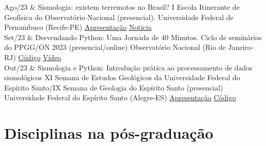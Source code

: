 \documentclass[10pt,a4paper,oneside]{book}
\begin{document}
\begin{subsummarybox}[frametitle=\faEdit{}\quad Seminários e workshops ministrados]
	\begin{paperlist}
		Ago/23  & Sismologia: existem terremotos no Brasil?
		\newline
		\faInfoCircle I Escola Itinerante de Geofísica do Observatório Nacional (presencial).
		\newline
		\faBuilding Universidade Federal de Pernambuco  (Recife-PE)
		\newline
		\faArchive{} \href{https://doi.org/10.6084/m9.figshare.25387180.v1}{Apresentação}
		\faBullhorn{} \href{https://www.ufpe.br/df/todos-os-informes/-/asset_publisher/znKKONCGSp59/content/a-primeira-escola-itinerante-de-geofisica-do-observatorio-nacional-ocorrera-na-ufpe-no-periodo-de-08-10-de-agosto-de-2023/441331}{Noticia}
		\\
		Set/23  & Desvendando Python: Uma Jornada de 40 Minutos.
		\newline
		\faInfoCircle Ciclo de seminários do PPGG/ON 2023 (presencial/online)
		\newline
		\faBuilding Observatório Nacional (Rio de Janeiro-RJ) 
		\newline
		\faGithub{} \href{https://github.com/dIOGOLOC/workshop_course_lecture/tree/6a0758f18303eecb6344a61fdbf874225da5e6be/ON_SET_2023}{Código}
		\faYoutube{} \href{https://youtu.be/LhRH2uYTWhc}{Vídeo}
		\\ 
		Out/23 & Sismologia e Python: Introdução prática ao processamento de dados sismológicos
		\newline
		\faInfoCircle XI Semana de Estudos Geológicos da Universidade Federal do Espírito Santo/IX Semana de Geologia do Espírito Santo (presencial)
		\newline
		\faBuilding Universidade Federal do Espírito Santo (Alegre-ES) 
		\newline
		\faArchive{} \href{https://doi.org/10.6084/m9.figshare.25387123.v1}{Apresentação}
		\faGithub{} \href{https://github.com/dIOGOLOC/workshop_course_lecture/tree/6a0758f18303eecb6344a61fdbf874225da5e6be/SEGEO_2023_UFES}{Código}
		\\
	\end{paperlist}
\end{subsummarybox}

\section{Disciplinas na pós-graduação}
\label{sec_ensino_grad}
\end{document}
